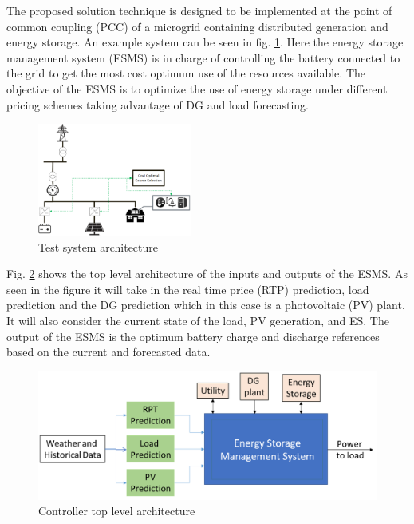 The proposed solution technique is designed to be implemented at the point of common coupling (PCC) of a microgrid containing distributed generation and energy storage. An example system can be seen in fig. \ref{fig:system_arch}. Here the energy storage management system (ESMS) is in charge of controlling the battery connected to the grid to get the most cost optimum use of the resources available. The objective of the ESMS is to optimize the use of energy storage under different pricing schemes taking advantage of DG and load forecasting.
\begin{figure}[!htbp]
\centering
\includegraphics[width=0.45\textwidth]{figs/System_architecture.png}
\caption{Test system architecture}
\label{fig:system_arch}
\vspace{-3mm}
\end{figure}

 Fig. \ref{fig:F1_CA} shows the top level architecture of the inputs and outputs of the ESMS. As seen in the figure it will take in the real time price (RTP) prediction, load prediction and the DG prediction which in this case is a photovoltaic (PV) plant. It will also consider the current state of the load, PV generation, and ES. The output of the ESMS is the optimum battery charge and discharge references based on the current and forecasted data.

\begin{figure}[!ht]
    \centering
    \includegraphics[width = \linewidth]{figs/EMS_FIG.png}
    \caption{Controller top level architecture}
    \label{fig:F1_CA}
\end{figure}


